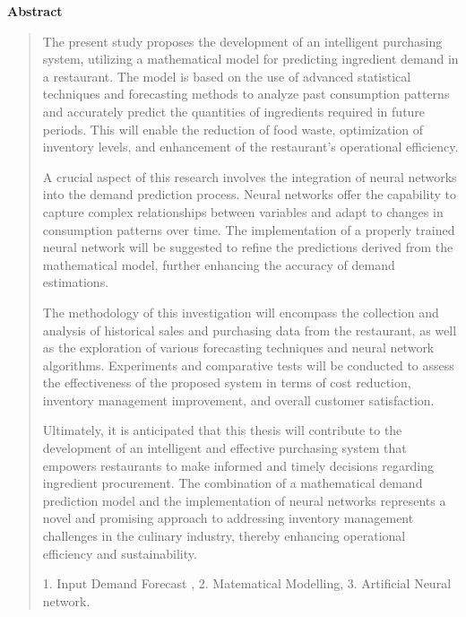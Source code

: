\thispagestyle{empty}
\begin{center}
\begin{LARGE}
\textbf{Abstract}
\end{LARGE}
\end{center}

\begin{quotation}
    The present study proposes the development of an intelligent purchasing system, utilizing a mathematical model for predicting ingredient demand in a restaurant. The model is based on the use of advanced statistical techniques and forecasting methods to analyze past consumption patterns and accurately predict the quantities of ingredients required in future periods. This will enable the reduction of food waste, optimization of inventory levels, and enhancement of the restaurant's operational efficiency.

    A crucial aspect of this research involves the integration of neural networks into the demand prediction process. Neural networks offer the capability to capture complex relationships between variables and adapt to changes in consumption patterns over time. The implementation of a properly trained neural network will be suggested to refine the predictions derived from the mathematical model, further enhancing the accuracy of demand estimations.
    
    The methodology of this investigation will encompass the collection and analysis of historical sales and purchasing data from the restaurant, as well as the exploration of various forecasting techniques and neural network algorithms. Experiments and comparative tests will be conducted to assess the effectiveness of the proposed system in terms of cost reduction, inventory management improvement, and overall customer satisfaction.
    
    Ultimately, it is anticipated that this thesis will contribute to the development of an intelligent and effective purchasing system that empowers restaurants to make informed and timely decisions regarding ingredient procurement. The combination of a mathematical demand prediction model and the implementation of neural networks represents a novel and promising approach to addressing inventory management challenges in the culinary industry, thereby enhancing operational efficiency and sustainability.
\vspace*{0.5cm}

 1. Input Demand Forecast
, 2. Matematical Modelling, 3. Artificial Neural network.

\end{quotation}
